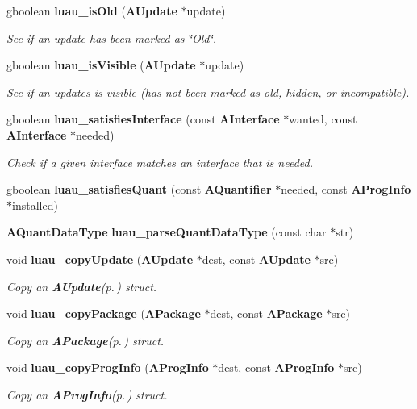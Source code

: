 \begin{CompactItemize}
gboolean {\bf luau\_\-is\-Old} ({\bf AUpdate} $\ast$update)
\begin{CompactList}\small\item\em See if an update has been marked as \char`\"{}Old\char`\"{}. \item\end{CompactList}\item 
gboolean {\bf luau\_\-is\-Visible} ({\bf AUpdate} $\ast$update)
\begin{CompactList}\small\item\em See if an updates is visible (has not been marked as old, hidden, or incompatible). \item\end{CompactList}\item 
gboolean {\bf luau\_\-satisfies\-Interface} (const {\bf AInterface} $\ast$wanted, const {\bf AInterface} $\ast$needed)
\begin{CompactList}\small\item\em Check if a given interface matches an interface that is needed. \item\end{CompactList}\item 
gboolean {\bf luau\_\-satisfies\-Quant} (const {\bf AQuantifier} $\ast$needed, const {\bf AProg\-Info} $\ast$installed)
\item 
{\bf AQuant\-Data\-Type} {\bf luau\_\-parse\-Quant\-Data\-Type} (const char $\ast$str)
\item 
void {\bf luau\_\-copy\-Update} ({\bf AUpdate} $\ast$dest, const {\bf AUpdate} $\ast$src)
\begin{CompactList}\small\item\em Copy an {\bf AUpdate}{\rm (p.\,\pageref{structAUpdate})} struct. \item\end{CompactList}\item 
void {\bf luau\_\-copy\-Package} ({\bf APackage} $\ast$dest, const {\bf APackage} $\ast$src)
\begin{CompactList}\small\item\em Copy an {\bf APackage}{\rm (p.\,\pageref{structAPackage})} struct. \item\end{CompactList}\item 
void {\bf luau\_\-copy\-Prog\-Info} ({\bf AProg\-Info} $\ast$dest, const {\bf AProg\-Info} $\ast$src)
\begin{CompactList}\small\item\em Copy an {\bf AProg\-Info}{\rm (p.\,\pageref{structAProgInfo})} struct. \item\end{CompactList}\item 

\end{CompactItemize}
